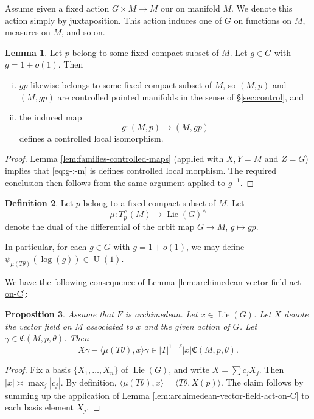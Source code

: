 \documentclass[reqno]{amsart}
\DeclareMathOperator{\U}{U}
\DeclareMathOperator{\Lie}{Lie}
\theoremstyle{plain} \newtheorem{theorem} {Theorem}
\newtheorem{proposition} [theorem] {Proposition}
\theoremstyle{definition} \newtheorem{definition} [theorem] {Definition}
\theoremstyle{itplain} %
\newtheorem{lemma}[theorem]{Lemma}
\numberwithin{equation}{section}
\numberwithin{theorem}{section}
\begin{document}
Assume given a fixed action $G \times M \rightarrow M$ our on manifold $M$.  We denote this action simply by juxtaposition.  This action induces one of $G$ on functions on $M$, measures on $M$, and so on.

\begin{lemma}\label{lem:standard2:G-defines-controlled-local-isoms}
  Let $p$ belong to some fixed compact subset of $M$.  Let $g \in G$ with $g = 1 + o(1)$.  Then
  \begin{enumerate}[(i)]
  \item $g p$ likewise belongs to some fixed compact subset of $M$, so $(M,p)$ and $(M, gp)$ are controlled pointed manifolds in the sense of \S\ref{sec:control}, and
  \item the induced map
    \begin{equation}\label{eq:g-:-m}
      g : (M,p) \rightarrow  (M, g p)
    \end{equation}
    defines a controlled local isomorphism.
  \end{enumerate}
\end{lemma}
\begin{proof}
  Lemma \ref{lem:families-controlled-maps} (applied with $X, Y = M$ and $Z = G$) implies that \eqref{eq:g-:-m} is defines controlled local morphism.  The required conclusion then follows from the same argument applied to $g^{-1}$.
\end{proof}

\begin{definition}
  Let $p$ belong to a fixed compact subset of $M$.  Let
  \begin{equation*}
\mu : T_p^\wedge(M) \rightarrow \Lie(G)^\wedge
\end{equation*}
denote the dual of the differential of the orbit map $G \rightarrow M$, $g \mapsto g p$. 
\end{definition}
In particular, for each $g \in G$ with $g = 1 + o(1)$, we may define $\psi_{\mu(T \theta)}(\log(g)) \in \U(1)$.

We have the following consequence of Lemma \ref{lem:archimedean-vector-field-act-on-C}:
\begin{proposition}\label{lem:archimedean-vector-field-act-on-C-2}
  Assume that $F$ is archimedean.  Let $x \in \Lie(G)$.  Let $X$ denote the vector field on $M$ associated to $x$ and the given action of $G$.  Let $\gamma \in \mathfrak{C}(M,p,\theta)$.  Then
  \begin{equation*}
    X \gamma - \langle \mu(T \theta), x \rangle \gamma
    \in
    |T|^{1-\delta}    |x|    \mathfrak{C}(M,p,\theta).
  \end{equation*}
\end{proposition}
\begin{proof}
  Fix a basis $\{X_1,\dotsc,X_n\}$ of $\Lie(G)$, and write $X = \sum c_j X_j$.   Then $|x| \asymp \max_j |c_j|$.  By definition, $\langle \mu(T \theta), x \rangle = \langle T \theta, X(p) \rangle$.  The claim follows by summing up the application of Lemma \ref{lem:archimedean-vector-field-act-on-C} to each basis element $X_j$.
\end{proof}
\end{document}
